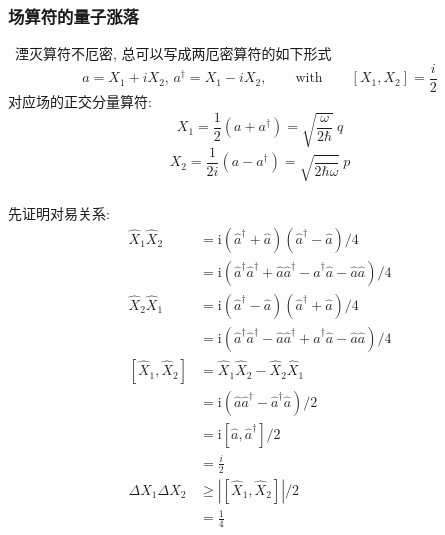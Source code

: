 \begin{frame}
 \frametitle{场算符的量子涨落}
 \例[10.试证明所有的相干态都是最小不确定度乘积态]{
   \[ \Delta X_1 \Delta X_2 =\dfrac{1}{4} \] 
  }
 \证~湮灭算符不厄密, 总可以写成两厄密算符的如下形式
 \[ a = X_1 + i X_2, \, a ^\dagger = X_1 - i X_2, \qquad \text{with}\qquad  [X_1, X_2]= \frac{i}{2} \]
 对应场的正交分量算符: 
 \[ X_{1} =\frac{1}{2}\left(a + a^{\dagger}\right) = \sqrt{\frac{\omega}{2 \hbar} }~q\]
 \[ X_{2} = \frac{1}{2 i}\left(a - a^{\dagger}\right)= \sqrt{\frac{}{2 \hbar\omega} }~p\]
\end{frame}

\begin{frame}
 \frametitle{}
      先证明对易关系: 
    \[ \begin{aligned}
        \hat{X}_{1} \hat{X}_{2} & =\mathrm{i}\left(\hat{a}^{\dagger}+\hat{a}\right)\left(\hat{a}^{\dagger}-\hat{a}\right) / 4\\ 
        &=\mathrm{i}\left(\hat{a}^{\dagger} \hat{a}^{\dagger}+\hat{a} \hat{a}^{\dagger}-\hat{a}^{\dagger} \hat{a}-\hat{a} \hat{a}\right) / 4 \\ 
        \hat{X}_{2} \hat{X}_{1} & = \mathrm{i}\left(\hat{a}^{\dagger}-\hat{a}\right)\left(\hat{a}^{\dagger}+\hat{a}\right) / 4 \\ 
        & =\mathrm{i}\left(\hat{a}^{\dagger} \hat{a}^{\dagger}-\hat{a} \hat{a}^{\dagger}+\hat{a}^{\dagger} \hat{a}-\hat{a} \hat{a}\right) / 4 \\ 
        \left[\hat{X}_{1}, \hat{X}_{2}\right] & =\hat{X}_{1} \hat{X}_{2}-\hat{X}_{2} \hat{X}_{1} \\ 
        &= \mathrm{i}\left(\hat{a} \hat{a}^{\dagger}-\hat{a}^{\dagger} \hat{a}\right) / 2 \\ 
        & =\mathrm{i}\left[\hat{a}, \hat{a}^{\dagger}\right] / 2  \\ &=  \frac{i}{2} \\ 
        \Delta X_1 \Delta X_2 & \geq  \left| \left[\hat{X}_{1}, \hat{X}_{2}\right]  \right| /2  \\ 
        &= \frac{1}{4}
    \end{aligned}\]

\end{frame}

